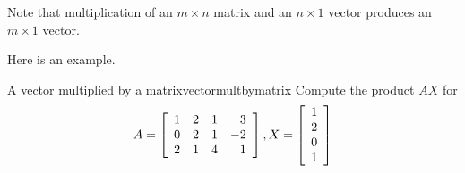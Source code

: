 Note that multiplication of an $m \times n$ matrix and an $n \times 1$ vector produces an $m \times 1$ vector.

Here is an example.

\begin{example}{A vector multiplied by a matrix}{vectormultbymatrix}
Compute the product $AX$ for 
\begin{equation*}
A = \left[
\begin{array}{rrrr}
1 & 2 & 1 & 3 \\
0 & 2 & 1 & -2 \\
2 & 1 & 4 & 1
\end{array}
\right], X =  \left[
\begin{array}{r}
1 \\
2 \\
0 \\
1
\end{array}
\right] 
\end{equation*}
\end{example}

